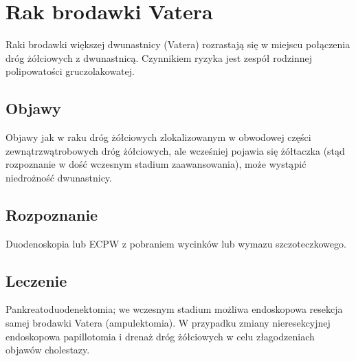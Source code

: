
\chapter{Rak brodawki Vatera}

Raki brodawki większej dwunastnicy (Vatera) rozrastają się w miejscu połączenia dróg żółciowych z dwunastnicą. 
Czynnikiem ryzyka jest zespół rodzinnej polipowatości gruczolakowatej.

\section{Objawy}
Objawy jak w raku dróg żółciowych zlokalizowanym w obwodowej części zewnątrzwątrobowych dróg żółciowych, ale wcześniej pojawia się żółtaczka (stąd rozpoznanie w dość wczesnym stadium zaawansowania), może wystąpić niedrożność dwunastnicy.

\section{Rozpoznanie}
Duodenoskopia lub ECPW z pobraniem wycinków lub wymazu szczoteczkowego.

\section{Leczenie}
Pankreatoduodenektomia; we wczesnym stadium możliwa endoskopowa resekcja samej brodawki Vatera (ampulektomia). 
W przypadku zmiany nieresekcyjnej endoskopowa papillotomia i drenaż dróg żółciowych w celu złagodzeniach objawów cholestazy.